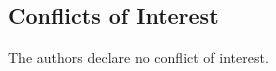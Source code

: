 \subsection*{Conflicts of Interest}
The authors declare no conflict of interest.


\cleardoublepage

